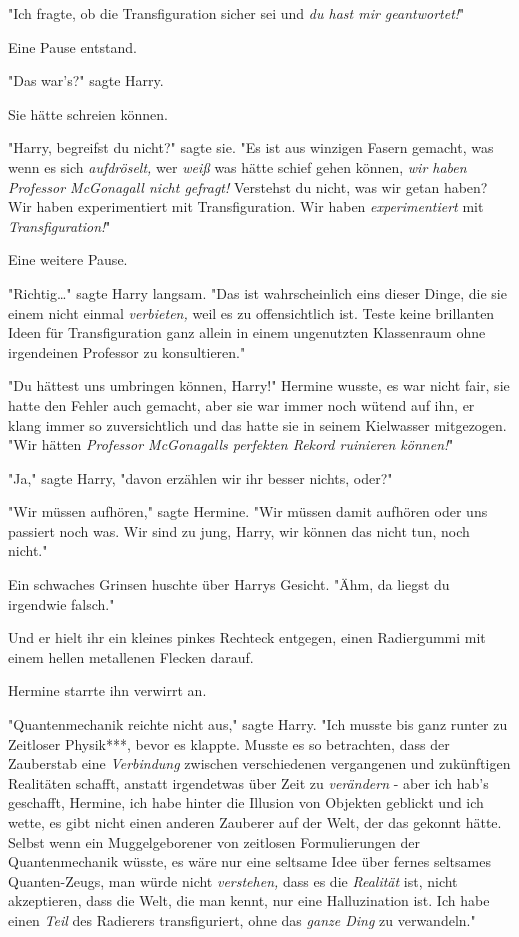 {"Ich fragte, ob die Transfiguration sicher sei und \emph{du hast mir geantwortet!}"

Eine Pause entstand.

"Das war's?" sagte Harry.

Sie hätte schreien können.

"Harry, begreifst du nicht?" sagte sie. "Es ist aus winzigen Fasern gemacht, was wenn es sich \emph{aufdröselt,} wer \emph{weiß} was hätte schief gehen können, \emph{wir haben Professor McGonagall nicht gefragt!} Verstehst du nicht, was wir getan haben? Wir haben experimentiert mit Transfiguration. Wir haben \emph{experimentiert} mit \emph{Transfiguration!}"

Eine weitere Pause.

"Richtig…" sagte Harry langsam. "Das ist wahrscheinlich eins dieser Dinge, die sie einem nicht einmal \emph{verbieten,} weil es zu offensichtlich ist. Teste keine brillanten Ideen für Transfiguration ganz allein in einem ungenutzten Klassenraum ohne irgendeinen Professor zu konsultieren."

"Du hättest uns umbringen können, Harry!" Hermine wusste, es war nicht fair, sie hatte den Fehler auch gemacht, aber sie war immer noch wütend auf ihn, er klang immer so zuversichtlich und das hatte sie in seinem Kielwasser mitgezogen. "Wir hätten \emph{Professor McGonagalls perfekten Rekord ruinieren können!}"

"Ja," sagte Harry, "davon erzählen wir ihr besser nichts, oder?"

"Wir müssen aufhören," sagte Hermine. "Wir müssen damit aufhören oder uns passiert noch was. Wir sind zu jung, Harry, wir können das nicht tun, noch nicht."

Ein schwaches Grinsen huschte über Harrys Gesicht. "Ähm, da liegst du irgendwie falsch."

Und er hielt ihr ein kleines pinkes Rechteck entgegen, einen Radiergummi mit einem hellen metallenen Flecken darauf.

Hermine starrte ihn verwirrt an.

"Quantenmechanik reichte nicht aus," sagte Harry. "Ich musste bis ganz runter zu Zeitloser Physik***, bevor es klappte. Musste es so betrachten, dass der Zauberstab eine \emph{Verbindung} zwischen verschiedenen vergangenen und zukünftigen Realitäten schafft, anstatt irgendetwas über Zeit zu \emph{verändern} - aber ich hab's geschafft, Hermine, ich habe hinter die Illusion von Objekten geblickt und ich wette, es gibt nicht einen anderen Zauberer auf der Welt, der das gekonnt hätte. Selbst wenn ein Muggelgeborener von zeitlosen Formulierungen der Quantenmechanik wüsste, es wäre nur eine seltsame Idee über fernes seltsames Quanten-Zeugs, man würde nicht \emph{verstehen,} dass es die \emph{Realität} ist, nicht akzeptieren, dass die Welt, die man kennt, nur eine Halluzination ist. Ich habe einen \emph{Teil} des Radierers transfiguriert, ohne das \emph{ganze Ding} zu verwandeln."

}

